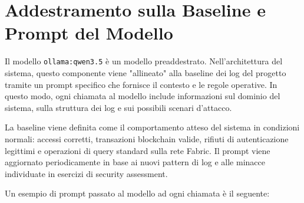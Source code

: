 \newpage
\section{Addestramento sulla Baseline e Prompt del Modello}

Il modello \texttt{ollama:qwen3.5} è un modello preaddestrato. Nell'architettura del sistema, questo componente viene "allineato" alla baseline dei log del progetto tramite un prompt specifico che fornisce il contesto e le regole operative. In questo modo, ogni chiamata al modello include informazioni sul dominio del sistema, sulla struttura dei log e sui possibili scenari d'attacco.

La baseline viene definita come il comportamento atteso del sistema in condizioni normali: accessi corretti, transazioni blockchain valide, rifiuti di autenticazione legittimi e operazioni di query standard sulla rete Fabric. Il prompt viene aggiornato periodicamente in base ai nuovi pattern di log e alle minacce individuate in esercizi di security assessment.

Un esempio di prompt passato al modello ad ogni chiamata è il seguente:

